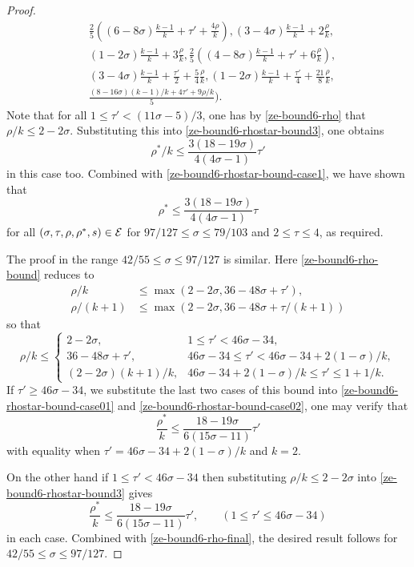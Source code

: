 \begin{proof}
\begin{equation}
\begin{split}
&\frac{2}{5}((6 - 8\sigma)\frac{k - 1}{k} + \tau' + \frac{4\rho}{k}), (3 - 4\sigma)\frac{k - 1}{k} + 2\frac{\rho}{k}, \\
&(1 - 2\sigma)\frac{k - 1}{k} + 3\frac{\rho}{k}, \frac{2}{5}((4 - 8\sigma)\frac{k - 1}{k} + \tau' + 6\frac{\rho}{k}),\\
&(3 - 4\sigma)\frac{k - 1}{k} + \frac{\tau'}{2} + \frac{5}{4}\frac{\rho}{k}, (1 - 2\sigma)\frac{k - 1}{k} + \frac{\tau'}{4} + \frac{21}{8}\frac{\rho}{k}, \\
&\frac{(8 - 16\sigma)(k - 1)/k + 4\tau' + 9\rho/k}{5}\bigg).
\end{split}
\end{equation}
Note that for all $1 \le \tau' < (11\sigma - 5)/3$, one has by \eqref{ze-bound6-rho} that $\rho/k \le 2 - 2\sigma$. Substituting this into \eqref{ze-bound6-rhostar-bound3}, one obtains
\[
\rho^*/k \le \frac{3(18-19\sigma)}{4(4\sigma-1)}\tau'
\]
in this case too. Combined with \eqref{ze-bound6-rhostar-bound-case1}, we have shown that
\[
\rho^* \le \frac{3(18-19\sigma)}{4(4\sigma-1)}\tau
\]
for all $(\sigma, \tau, \rho, \rho^*, s) \in \mathcal{E}$ for $97/127 \le \sigma\le 79/103$ and $2 \le \tau \le 4$, as required.

The proof in the range $42/55 \le \sigma \le 97/127$ is similar. Here \eqref{ze-bound6-rho-bound} reduces to
\begin{align*}
\rho/k &\le \max(2 - 2\sigma, 36 - 48\sigma + \tau'),\\
\rho/(k + 1) &\le \max(2 - 2\sigma, 36 - 48\sigma + \tau/(k + 1))
\end{align*}
so that
\begin{equation}\label{ze-bound6-rho-case2}
\rho/k \le \begin{cases}
2 - 2\sigma,&1 \le \tau' < 46\sigma - 34,\\
36 - 48\sigma + \tau',& 46\sigma - 34 \le \tau' < 46\sigma - 34 + 2(1 - \sigma)/k,\\
(2 - 2\sigma)(k + 1)/k,& 46\sigma - 34 + 2(1 - \sigma)/k \le \tau' \le 1 + 1/k.
\end{cases}
\end{equation}
If $\tau' \ge 46\sigma - 34$, we substitute the last two cases of this bound into \eqref{ze-bound6-rhostar-bound-case01} and \eqref{ze-bound6-rhostar-bound-case02}, one may verify that
\begin{equation}\label{ze-bound6-rho-final}
\frac{\rho^*}{k} \le \frac{18 - 19\sigma}{6(15\sigma - 11)}\tau'
\end{equation}
with equality when $\tau' = 46\sigma - 34 + 2(1 - \sigma)/k$ and $k = 2$.

On the other hand if $1 \le \tau' < 46\sigma - 34$ then substituting $\rho/k \le 2 - 2\sigma$ into \eqref{ze-bound6-rhostar-bound3} gives
\[
\frac{\rho^*}{k} \le \frac{18 - 19\sigma}{6(15\sigma - 11)}\tau',\qquad (1 \le \tau' \le 46\sigma - 34)
\]
in each case. Combined with \eqref{ze-bound6-rho-final}, the desired result follows for $42/55 \le \sigma \le 97/127$.
\end{proof}

